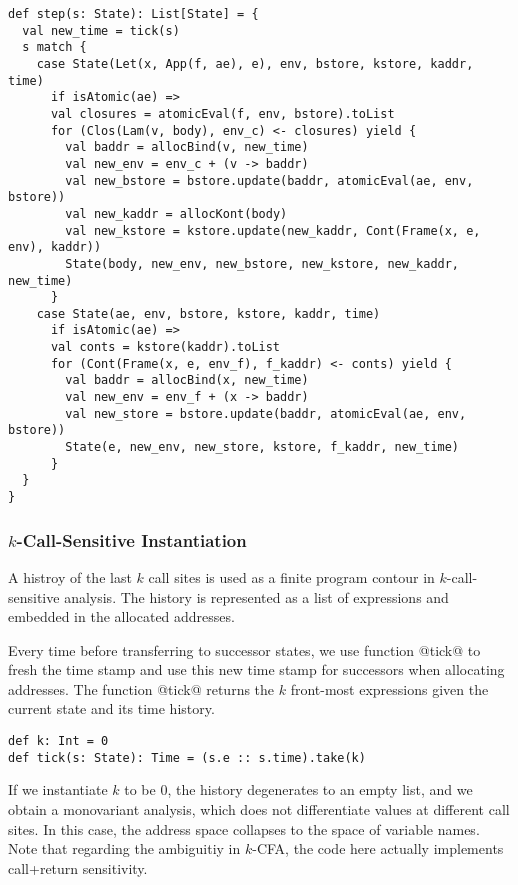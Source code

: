 \documentclass[acmsmall,review,anonymous]{acmart}\settopmatter{printfolios=true,printccs=false,printacmref=false}
\begin{document}
\begin{lstlisting}
def step(s: State): List[State] = {
  val new_time = tick(s)
  s match {
    case State(Let(x, App(f, ae), e), env, bstore, kstore, kaddr, time) 
      if isAtomic(ae) =>
      val closures = atomicEval(f, env, bstore).toList
      for (Clos(Lam(v, body), env_c) <- closures) yield {
        val baddr = allocBind(v, new_time)
        val new_env = env_c + (v -> baddr)
        val new_bstore = bstore.update(baddr, atomicEval(ae, env, bstore))
        val new_kaddr = allocKont(body)
        val new_kstore = kstore.update(new_kaddr, Cont(Frame(x, e, env), kaddr))
        State(body, new_env, new_bstore, new_kstore, new_kaddr, new_time)
      }
    case State(ae, env, bstore, kstore, kaddr, time) 
      if isAtomic(ae) =>
      val conts = kstore(kaddr).toList
      for (Cont(Frame(x, e, env_f), f_kaddr) <- conts) yield {
        val baddr = allocBind(x, new_time)
        val new_env = env_f + (x -> baddr)
        val new_store = bstore.update(baddr, atomicEval(ae, env, bstore))
        State(e, new_env, new_store, kstore, f_kaddr, new_time)
      }
  }
}
\end{lstlisting}

\subsubsection{$k$-Call-Sensitive Instantiation} \label{kcfainst}

A histroy of the last $k$ call sites is used as a finite program contour in
$k$-call-sensitive analysis.
The history is represented as a list of expressions and embedded
in the allocated addresses.

Every time before transferring to successor states, we use function @tick@ to
fresh the time stamp and use this new time stamp for successors when allocating addresses. 
The function @tick@ returns the $k$ front-most expressions given the current state and its
time history.

\begin{lstlisting}
def k: Int = 0
def tick(s: State): Time = (s.e :: s.time).take(k)
\end{lstlisting}

If we instantiate $k$ to be $0$, the history degenerates to an empty list,
and we obtain a monovariant analysis, which does
not differentiate values at different call sites. In this case, the address
space collapses to the space of variable names.
Note that regarding the ambiguitiy in $k$-CFA\cite{Gilray:2016:ACP:2951913.2951936},
the code here actually implements call+return sensitivity.
\end{document}
